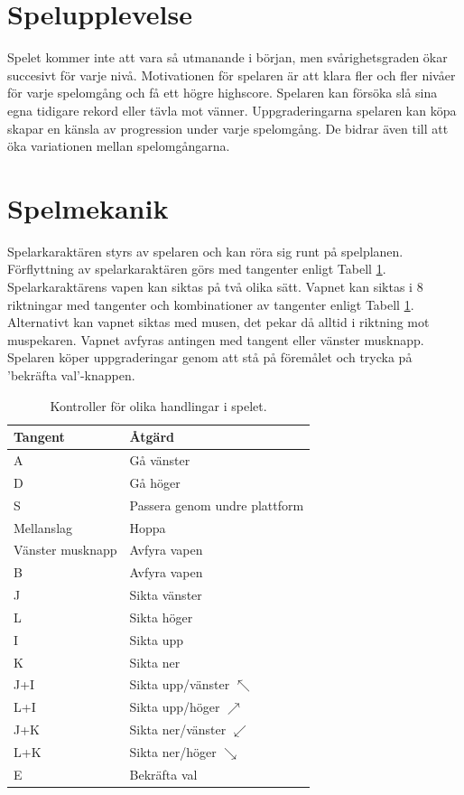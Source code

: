 \documentclass{TDP005mall}
\begin{document}
\section{Spelupplevelse}
Spelet kommer inte att vara så utmanande i början, men svårighetsgraden ökar succesivt för varje nivå. Motivationen för spelaren är att klara fler och fler nivåer för varje spelomgång och få ett högre highscore. Spelaren kan försöka slå sina egna tidigare rekord eller tävla mot vänner. 
Uppgraderingarna spelaren kan köpa skapar en känsla av progression under varje spelomgång. De bidrar även till att öka variationen mellan spelomgångarna. 

\newpage

\section{Spelmekanik}
Spelarkaraktären styrs av spelaren och kan röra sig runt på spelplanen. Förflyttning av spelarkaraktären görs med tangenter enligt Tabell \ref{tab:1}. Spelarkaraktärens vapen kan siktas på två olika sätt. Vapnet kan siktas i 8 riktningar med tangenter och kombinationer av tangenter enligt Tabell \ref{tab:1}. Alternativt kan vapnet siktas med musen, det pekar då alltid i riktning mot muspekaren. Vapnet avfyras antingen med tangent eller vänster musknapp. Spelaren köper uppgraderingar genom att stå på föremålet och trycka på 'bekräfta val'-knappen. 

\begin{table}[!h]
\centering
\caption{\label{tab:1} Kontroller för olika handlingar i spelet.}
\begin{tabularx}{0.6\columnwidth}{|l|X|}
\hline
Tangent & Åtgärd \\\hline
A & Gå vänster \\\hline
D & Gå höger \\\hline
S & Passera genom undre plattform \\\hline
Mellanslag & Hoppa \\\hline
Vänster musknapp & Avfyra vapen \\\hline
B & Avfyra vapen \\\hline
J & Sikta vänster \\\hline
L & Sikta höger \\\hline
I & Sikta upp \\\hline
K & Sikta ner \\\hline
J+I & Sikta upp/vänster $\nwarrow$ \\\hline
L+I & Sikta upp/höger $\nearrow$ \\\hline
J+K & Sikta ner/vänster $\swarrow$ \\\hline
L+K & Sikta ner/höger $\searrow$ \\\hline
E & Bekräfta val \\\hline
\end{tabularx}
\end{table}
\end{document}
